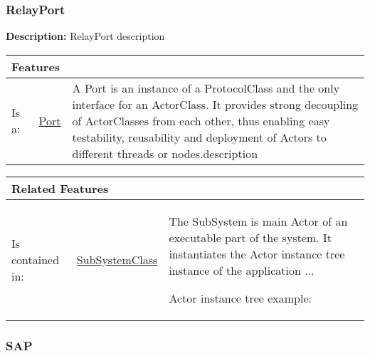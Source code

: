 			
			
		\vspace{\baselineskip}
		\vspace{\baselineskip}
		\vspace{\baselineskip}
		
		\subsubsection{\huge RelayPort}
			\hypertarget{ref:RelayPort}{}
			
			\textbf{Description:} RelayPort description
			
			
			\begingroup
			\renewcommand{\arraystretch}{1.8} %
			\begin{longtable}{p{2.5cm}|p{4cm} p{}}
				\multicolumn{2}{l}{\textbf{\large Features}} & \\
				\hline
			Is a: & \tabitem \hyperlink{ref:Port}{Port}  & A Port is an instance of a ProtocolClass and the only interface for an ActorClass. It provides strong decoupling of ActorClasses from each other, thus enabling easy testability, reusability and deployment of Actors to different threads or nodes.description \\
			\hline
			\end{longtable}
			\endgroup
			
			\begingroup
			\renewcommand{\arraystretch}{1.8} %
			\begin{longtable}{p{2.5cm}|p{4cm} p{}}
				\multicolumn{2}{l}{\textbf{\large Related Features}} & \\
				\hline
			Is contained in: & \tabitem \hyperlink{ref:SubSystemClass}{SubSystemClass}  & The SubSystem is main Actor of an executable part of the system. It instantiates the Actor instance tree instance of the application ...
				
				Actor instance tree example:
			\\
			\hline
			\end{longtable}
			\endgroup
			
			
			
		\vspace{\baselineskip}
		\vspace{\baselineskip}
		\vspace{\baselineskip}
		
		\subsubsection{\huge SAP}
			\hypertarget{ref:SAP}{}
			
